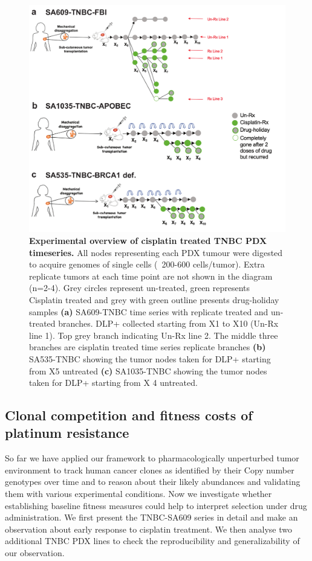 \begin{figure}
\centering
\includegraphics[width=\textwidth]{Figures/chap4/treatedtimeseriesgreen.pdf}

\caption[Experimental overview of TNBC PDX treated time series]
	{\small
	\textbf{Experimental overview of cisplatin treated TNBC PDX timeseries.}
	      All nodes representing each PDX tumour were digested to acquire genomes of single cells (~200-600 cells/tumor). Extra replicate tumors at each time point are not shown in the diagram (n=2-4). Grey circles represent un-treated, green represents Cisplatin treated and grey with green outline presents drug-holiday samples \textbf{(a)} SA609-TNBC time series with replicate treated and un-treated branches. DLP+ collected starting from X1 to X10 (Un-Rx line 1). Top grey branch indicating Un-Rx line 2. The middle three branches are cisplatin treated time series replicate branches \textbf{(b)} SA535-TNBC showing the tumor nodes taken for DLP+ starting from X5 untreated \textbf{(c)} SA1035-TNBC showing the tumor nodes taken for DLP+ starting from X 4 untreated.}
	
	\label{fig:treatedtimeseriesgreen}
\end{figure}

\subsection{Clonal competition and fitness costs of platinum resistance}
So far we have applied our framework to pharmacologically unperturbed tumor environment to track human cancer clones as identified by their Copy number genotypes over time and to reason about their likely abundances and validating them with various experimental conditions. Now we investigate whether establishing baseline fitness measures could help to interpret selection under drug administration. We first present the TNBC-SA609 series in detail and make an observation about early response to cisplatin treatment. We then analyse two
additional TNBC PDX lines to check the reproducibility  and generalizability of our observation.

